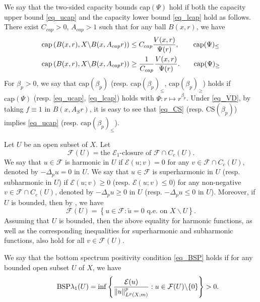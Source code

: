\documentclass[11pt,a4paper]{article}
\numberwithin{equation}{section}
\theoremstyle{plain}
\theoremstyle{definition}
\begin{document}
We say that the two-sided capacity bounds \hypertarget{eq_cap}{$\text{cap}(\Psi)$} hold if both the capacity upper bound \ref{eq_ucap} and the capacity lower bound \ref{eq_lcap} hold as follows. There exist $C_{cap}>0$, $A_{cap}>1$ such that for any ball $B(x,r)$, we have
\begin{align*}
\mathrm{cap}\left(B(x,r),X\backslash B(x,A_{cap}r)\right)&\le C_{cap} \frac{V(x,r)}{\Psi(r)},\label{eq_ucap}\tag*{$\text{cap}(\Psi)_{\le}$}\\
\mathrm{cap}\left(B(x,r),X\backslash B(x,A_{cap}r)\right)&\ge \frac{1}{C_{cap}} \frac{V(x,r)}{\Psi(r)}.\label{eq_lcap}\tag*{$\text{cap}(\Psi)_{\ge}$}
\end{align*}
For $\beta_p>0$, we say that \hypertarget{eq_capbeta}{$\text{cap}(\beta_p)$} (resp. \hypertarget{eq_ucapbeta}{$\text{cap}(\beta_p)_{\le}$}, \hypertarget{eq_lcapbeta}{$\text{cap}(\beta_p)_{\ge}$}) holds if \hyperlink{eq_cap}{$\text{cap}(\Psi)$} (resp. \ref{eq_ucap}, \ref{eq_lcap}) holds with $\Psi:r\mapsto r^{\beta_p}$. Under \ref{eq_VD}, by taking $f\equiv1$ in $B(x,A_Sr)$, it is easy to see that \ref{eq_CS} (resp. \hyperlink{eq_CSbeta}{$\text{CS}(\beta_p)$}) implies \ref{eq_ucap} (resp. \hyperlink{eq_ucapbeta}{$\text{cap}(\beta_p)_{\le}$}).

Let $U$ be an open subset of $X$. Let
$$\mathcal{F}(U)=\text{the }\mathcal{E}_1\text{-closure of }\mathcal{F}\cap C_c(U).$$
We say that $u\in\mathcal{F}$ is harmonic in $U$ if $\mathcal{E}(u;v)=0$ for any $v\in\mathcal{F}\cap C_c(U)$, denoted by $-\Delta_pu=0$ in $U$. We say that $u\in\mathcal{F}$ is superharmonic in $U$ (resp. subharmonic in $U$) if $\mathcal{E}(u;v)\ge0$ (resp. $\mathcal{E}(u;v)\le0$) for any non-negative $v\in\mathcal{F}\cap C_c(U)$, denoted by $-\Delta_pu\ge0$ in $U$ (resp. $-\Delta_pu\le0$ in $U$). Moreover, if $U$ is bounded, then by \cite[Lemma 6.2]{Yan25c}, we have
$$\mathcal{F}(U)=\left\{u\in\mathcal{F}:\widetilde{u}=0\text{ q.e. on }X\backslash U\right\}.$$
Assuming that $U$ is bounded, then the above equality for harmonic functions, as well as the corresponding inequalities for superharmonic and subharmonic functions, also hold for all $v\in\mathcal{F}(U)$.

We say that the bottom spectrum positivity condition \ref{eq_BSP} holds if for any bounded open subset $U$ of $X$, we have
\begin{equation*}\label{eq_BSP}\tag*{\text{BSP}}
\lambda_1(U)=\inf \left\{\frac{\mathcal{E}(u)}{\lVert u\rVert_{L^p(X;m)}^p}:u\in \mathcal{F}(U)\backslash \{0\}\right\}>0.
\end{equation*}
\end{document}
